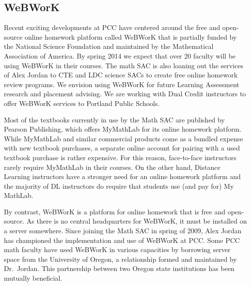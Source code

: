 
\subsection{WeBWorK}
Recent exciting developments at PCC have centered around the free and open-source online homework platform called WeBWorK that is partially funded by the National Science Foundation and maintained by the Mathematical Association of America. By spring 2014 we expect that over 20 faculty will be using WeBWorK in their courses. The math SAC is also loaning out the services of Alex Jordan to CTE and LDC science SACs to create free online homework review programs. We envision using WeBWorK for future Learning Assessment research and placement advising. We are working with Dual Credit instructors to offer WeBWorK services to Portland Public Schools.

Most of the textbooks currently in use by the Math SAC are published by Pearson Publishing, which offers MyMathLab for its online homework platform. While MyMathLab and similar commercial products come as a bundled expense with new textbook purchases, a separate online account for pairing with a used textbook purchase is rather expensive. For this reason, face-to-face instructors rarely require MyMathLab in their courses. On the other hand, Distance Learning instructors have a stronger need for an online homework platform and the majority of DL instructors do require that students use (and pay for) My MathLab.

By contrast, WeBWorK is a platform for online homework that is free and open-source. As there is no central headquarters for WeBWorK, it must be installed on a server somewhere. Since joining the Math SAC in spring of 2009, Alex Jordan has championed the implementation and use of WeBWorK at PCC. Some PCC math faculty have used WeBWorK in various capacities by borrowing server space from the University of Oregon, a relationship formed and maintained by Dr.\ Jordan. This partnership between two Oregon state institutions has been mutually beneficial. %

